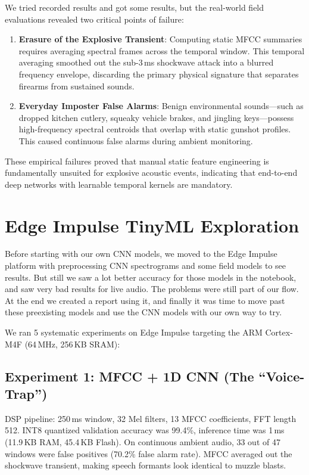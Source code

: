 \documentclass[conference]{IEEEtran}
\begin{document}
We tried recorded results and got some results, but the real-world field evaluations revealed two critical points of failure:
\begin{enumerate}
    \item \textbf{Erasure of the Explosive Transient}: Computing static MFCC summaries requires averaging spectral frames across the temporal window. This temporal averaging smoothed out the sub-3\,ms shockwave attack into a blurred frequency envelope, discarding the primary physical signature that separates firearms from sustained sounds.
    \item \textbf{Everyday Imposter False Alarms}: Benign environmental sounds---such as dropped kitchen cutlery, squeaky vehicle brakes, and jingling keys---possess high-frequency spectral centroids that overlap with static gunshot profiles. This caused continuous false alarms during ambient monitoring.
\end{enumerate}
These empirical failures proved that manual static feature engineering is fundamentally unsuited for explosive acoustic events, indicating that end-to-end deep networks with learnable temporal kernels are mandatory.

\section{Edge Impulse TinyML Exploration}
\label{sec:edge_impulse}

Before starting with our own CNN models, we moved to the Edge Impulse platform with preprocessing CNN spectrograms and some field models to see results. But still we saw a lot better accuracy for those models in the notebook, and saw very bad results for live audio. The problems were still part of our flow. At the end we created a report using it, and finally it was time to move past these preexisting models and use the CNN models with our own way to try.

We ran 5 systematic experiments on Edge Impulse targeting the ARM Cortex-M4F (64\,MHz, 256\,KB SRAM):

\subsection{Experiment 1: MFCC + 1D CNN (The ``Voice-Trap'')}
DSP pipeline: 250\,ms window, 32 Mel filters, 13 MFCC coefficients, FFT length 512. INT8 quantized validation accuracy was 99.4\%, inference time was 1\,ms (11.9\,KB RAM, 45.4\,KB Flash). On continuous ambient audio, 33 out of 47 windows were false positives (70.2\% false alarm rate). MFCC averaged out the shockwave transient, making speech formants look identical to muzzle blasts.
\end{document}
